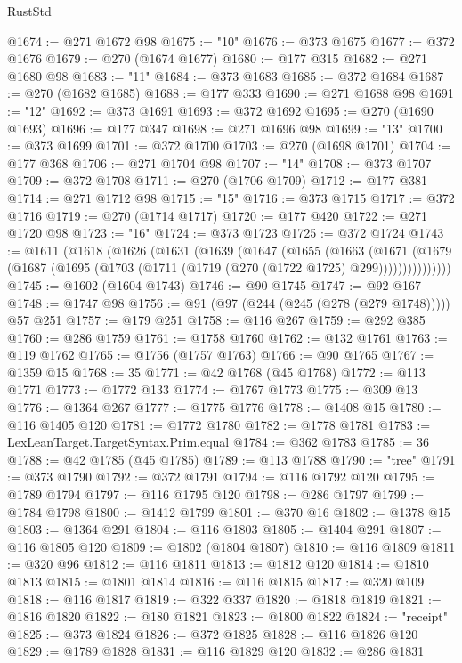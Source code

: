 \begin{lexlean}{RustStd}
\begin{coremodule}
@1674 := @271 @1672 @98
@1675 := "10"
@1676 := @373 @1675
@1677 := @372 @1676
@1679 := @270 (@1674 @1677)
@1680 := @177 @315
@1682 := @271 @1680 @98
@1683 := "11"
@1684 := @373 @1683
@1685 := @372 @1684
@1687 := @270 (@1682 @1685)
@1688 := @177 @333
@1690 := @271 @1688 @98
@1691 := "12"
@1692 := @373 @1691
@1693 := @372 @1692
@1695 := @270 (@1690 @1693)
@1696 := @177 @347
@1698 := @271 @1696 @98
@1699 := "13"
@1700 := @373 @1699
@1701 := @372 @1700
@1703 := @270 (@1698 @1701)
@1704 := @177 @368
@1706 := @271 @1704 @98
@1707 := "14"
@1708 := @373 @1707
@1709 := @372 @1708
@1711 := @270 (@1706 @1709)
@1712 := @177 @381
@1714 := @271 @1712 @98
@1715 := "15"
@1716 := @373 @1715
@1717 := @372 @1716
@1719 := @270 (@1714 @1717)
@1720 := @177 @420
@1722 := @271 @1720 @98
@1723 := "16"
@1724 := @373 @1723
@1725 := @372 @1724
@1743 := @1611
    (@1618
      (@1626
        (@1631
          (@1639
            (@1647
              (@1655
                (@1663
                  (@1671
                    (@1679
                      (@1687 (@1695 (@1703 (@1711 (@1719 (@270 (@1722 @1725) @299)))))))))))))))
@1745 := @1602 (@1604 @1743)
@1746 := @90 @1745
@1747 := @92 @167
@1748 := @1747 @98
@1756 := @91 (@97 (@244 (@245 (@278 (@279 @1748))))) @57 @251
@1757 := @179 @251
@1758 := @116 @267
@1759 := @292 @385
@1760 := @286 @1759
@1761 := @1758 @1760
@1762 := @132 @1761
@1763 := @119 @1762
@1765 := @1756 (@1757 @1763)
@1766 := @90 @1765
@1767 := @1359 @15
@1768 := 35
@1771 := @42 @1768 (@45 @1768)
@1772 := @113 @1771
@1773 := @1772 @133
@1774 := @1767 @1773
@1775 := @309 @13
@1776 := @1364 @267
@1777 := @1775 @1776
@1778 := @1408 @15
@1780 := @116 @1405 @120
@1781 := @1772 @1780
@1782 := @1778 @1781
@1783 := LexLeanTarget.TargetSyntax.Prim.equal
@1784 := @362 @1783
@1785 := 36
@1788 := @42 @1785 (@45 @1785)
@1789 := @113 @1788
@1790 := "tree"
@1791 := @373 @1790
@1792 := @372 @1791
@1794 := @116 @1792 @120
@1795 := @1789 @1794
@1797 := @116 @1795 @120
@1798 := @286 @1797
@1799 := @1784 @1798
@1800 := @1412 @1799
@1801 := @370 @16
@1802 := @1378 @15
@1803 := @1364 @291
@1804 := @116 @1803
@1805 := @1404 @291
@1807 := @116 @1805 @120
@1809 := @1802 (@1804 @1807)
@1810 := @116 @1809
@1811 := @320 @96
@1812 := @116 @1811
@1813 := @1812 @120
@1814 := @1810 @1813
@1815 := @1801 @1814
@1816 := @116 @1815
@1817 := @320 @109
@1818 := @116 @1817
@1819 := @322 @337
@1820 := @1818 @1819
@1821 := @1816 @1820
@1822 := @180 @1821
@1823 := @1800 @1822
@1824 := "receipt"
@1825 := @373 @1824
@1826 := @372 @1825
@1828 := @116 @1826 @120
@1829 := @1789 @1828
@1831 := @116 @1829 @120
@1832 := @286 @1831

\end{coremodule}
\end{lexlean}
